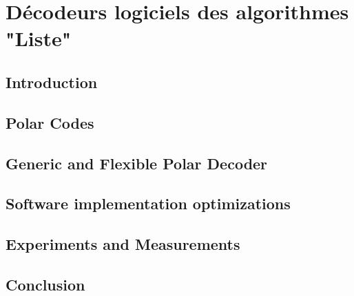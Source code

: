 \chapter{Décodeurs logiciels des algorithmes "Liste"} %


\vspace*{\fill}
\minitocTITI
\vspace*{\fill}
\newpage


\section{Introduction}

\section{Polar Codes}

\section{Generic and Flexible Polar Decoder}

\section{Software implementation optimizations}

\section{Experiments and Measurements}

\section{Conclusion}
